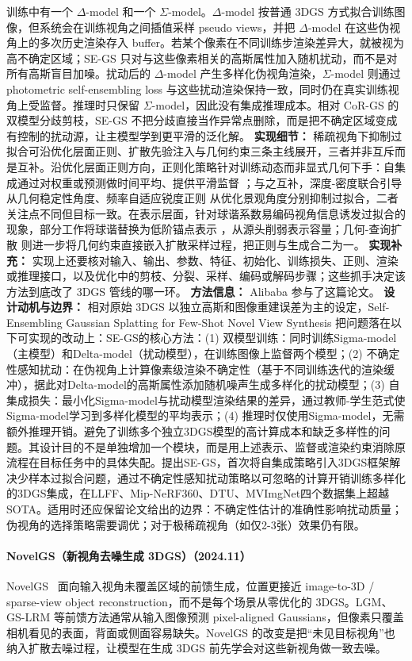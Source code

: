 训练中有一个 $\Delta$-model 和一个 $\Sigma$-model。$\Delta$-model 按普通 3DGS 方式拟合训练图像，但系统会在训练视角之间插值采样 pseudo views，并把 $\Delta$-model 在这些伪视角上的多次历史渲染存入 buffer。若某个像素在不同训练步渲染差异大，就被视为高不确定区域；SE-GS 只对与这些像素相关的高斯属性加入随机扰动，而不是对所有高斯盲目加噪。扰动后的 $\Delta$-model 产生多样化伪视角渲染，$\Sigma$-model 则通过 photometric self-ensembling loss 与这些扰动渲染保持一致，同时仍在真实训练视角上受监督。推理时只保留 $\Sigma$-model，因此没有集成推理成本。相对 CoR-GS 的双模型分歧剪枝，SE-GS 不把分歧直接当作异常点删除，而是把不确定区域变成有控制的扰动源，让主模型学到更平滑的泛化解。
\textbf{实现细节：} 稀疏视角下抑制过拟合可沿优化层面正则、扩散先验注入与几何约束三条主线展开，三者并非互斥而是互补。沿优化层面正则方向，正则化策略针对训练动态而非显式几何下手：自集成通过对权重或预测做时间平均、提供平滑监督 ；与之互补，深度-密度联合引导 从几何稳定性角度、频率自适应锐度正则 从优化景观角度分别抑制过拟合，二者关注点不同但目标一致。在表示层面，针对球谐系数易编码视角信息诱发过拟合的现象，部分工作将球谐替换为低阶锚点表示 ，从源头削弱表示容量；几何-查询扩散 则进一步将几何约束直接嵌入扩散采样过程，把正则与生成合二为一。
\textbf{实现补充：} 实现上还要核对输入、输出、参数、特征、初始化、训练损失、正则、渲染或推理接口，以及优化中的剪枝、分裂、采样、编码或解码步骤；这些抓手决定该方法到底改了 3DGS 管线的哪一环。
\textbf{方法信息：} Alibaba 参与了这篇论文。
\textbf{设计动机与边界：} 相对原始 3DGS 以独立高斯和图像重建误差为主的设定，Self-Ensembling Gaussian Splatting for Few-Shot Novel View Synthesis 把问题落在以下可实现的改动上：SE-GS的核心方法：(1) 双模型训练：同时训练Sigma-model（主模型）和Delta-model（扰动模型），在训练图像上监督两个模型；(2) 不确定性感知扰动：在伪视角上计算像素级渲染不确定性（基于不同训练迭代的渲染缓冲），据此对Delta-model的高斯属性添加随机噪声生成多样化的扰动模型；(3) 自集成损失：最小化Sigma-model与扰动模型渲染结果的差异，通过教师-学生范式使Sigma-model学习到多样化模型的平均表示；(4) 推理时仅使用Sigma-model，无需额外推理开销。避免了训练多个独立3DGS模型的高计算成本和缺乏多样性的问题。其设计目的不是单独增加一个模块，而是用上述表示、监督或渲染约束消除原流程在目标任务中的具体失配。提出SE-GS，首次将自集成策略引入3DGS框架解决少样本过拟合问题，通过不确定性感知扰动策略以可忽略的计算开销训练多样化的3DGS集成，在LLFF、Mip-NeRF360、DTU、MVImgNet四个数据集上超越SOTA。适用时还应保留论文给出的边界：不确定性估计的准确性影响扰动质量；伪视角的选择策略需要调优；对于极稀疏视角（如仅2-3张）效果仍有限。
\paragraph{NovelGS（新视角去噪生成 3DGS）（2024.11）}
NovelGS~\cite{2411_16779} 面向输入视角未覆盖区域的前馈生成，位置更接近 image-to-3D / sparse-view object reconstruction，而不是每个场景从零优化的 3DGS。LGM、GS-LRM 等前馈方法通常从输入图像预测 pixel-aligned Gaussians，但像素只覆盖相机看见的表面，背面或侧面容易缺失。NovelGS 的改变是把“未见目标视角”也纳入扩散去噪过程，让模型在生成 3DGS 前先学会对这些新视角做一致去噪。

